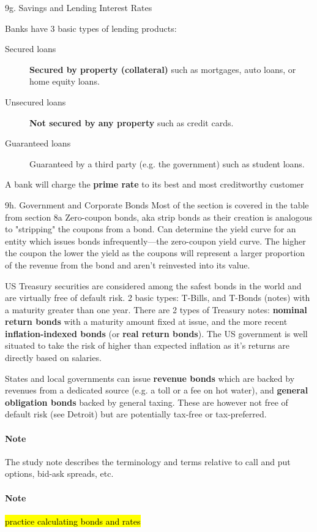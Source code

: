 \begin{CHPT_SUMM_AUTO}[label = {L.-9g}]{9g. Savings and Lending Interest Rates}
\tcbline

Banks have 3 basic types of lending products:
\begin{description}
	\item[Secured loans]	\textbf{Secured by property (collateral)} such as mortgages, auto loans, or home equity loans.
	\item[Unsecured loans]	\textbf{Not secured by any property} such as credit cards.
	\item[Guaranteed loans]	Guaranteed by a third party (e.g. the government) such as student loans.
\end{description}

A bank will charge the \textbf{prime rate} to its best and most creditworthy customer
\end{CHPT_SUMM_AUTO}

\begin{CHPT_SUMM_AUTO}[label = {L.-9h}]{9h. Government and Corporate Bonds}
Most of the section is covered in the table from section 8a
Zero-coupon bonds, aka strip bonds as their creation is analogous to "stripping" the coupons from a bond.
Can determine the yield curve for an entity which issues bonds infrequently---the zero-coupon yield curve. The higher the coupon the lower the yield as the coupons will represent a larger proportion of the revenue from the bond and aren't reinvested into its value.

\tcbline

US Treasury securities are considered among the safest bonds in the world and are virtually free of default risk.
2 basic types: T-Bills, and T-Bonds (notes) with a maturity greater than one year. 
There are 2 types of Treasury notes: \textbf{nominal return bonds} with a maturity amount fixed at issue, and the more recent \textbf{inflation-indexed bonds} (or \textbf{real return bonds}). The US government is well situated to take the risk of higher than expected inflation as it's returns are directly based on salaries.

\tcbline

States and local governments can issue \textbf{revenue bonds} which are backed by revenues from a dedicated source (e.g. a toll or a fee on hot water), and \textbf{general obligation bonds} backed by general taxing. These are however not free of default risk (see Detroit) but are potentially tax-free or tax-preferred.

\tcbline

\paragraph{Note}	The study note describes the terminology and terms relative to call and put options, bid-ask spreads, etc.
\paragraph{Note}	\hl{practice calculating bonds and rates}
\end{CHPT_SUMM_AUTO}

